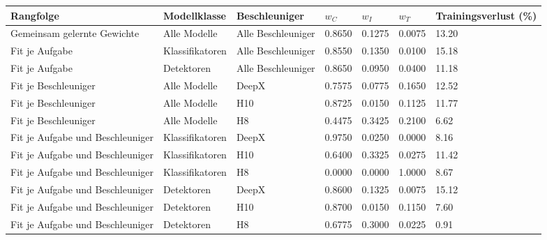 \begin{tabular}{@{}lllllll@{}}
\toprule
Rangfolge & Modellklasse & Beschleuniger & $w_C$ & $w_I$ & $w_T$ & Trainingsverlust (\%) \\
\midrule
Gemeinsam gelernte Gewichte & Alle Modelle & Alle Beschleuniger & 0.8650 & 0.1275 & 0.0075 & 13.20 \\
Fit je Aufgabe & Klassifikatoren & Alle Beschleuniger & 0.8550 & 0.1350 & 0.0100 & 15.18 \\
Fit je Aufgabe & Detektoren & Alle Beschleuniger & 0.8650 & 0.0950 & 0.0400 & 11.18 \\
Fit je Beschleuniger & Alle Modelle & DeepX & 0.7575 & 0.0775 & 0.1650 & 12.52 \\
Fit je Beschleuniger & Alle Modelle & H10 & 0.8725 & 0.0150 & 0.1125 & 11.77 \\
Fit je Beschleuniger & Alle Modelle & H8 & 0.4475 & 0.3425 & 0.2100 & 6.62 \\
Fit je Aufgabe und Beschleuniger & Klassifikatoren & DeepX & 0.9750 & 0.0250 & 0.0000 & 8.16 \\
Fit je Aufgabe und Beschleuniger & Klassifikatoren & H10 & 0.6400 & 0.3325 & 0.0275 & 11.42 \\
Fit je Aufgabe und Beschleuniger & Klassifikatoren & H8 & 0.0000 & 0.0000 & 1.0000 & 8.67 \\
Fit je Aufgabe und Beschleuniger & Detektoren & DeepX & 0.8600 & 0.1325 & 0.0075 & 15.12 \\
Fit je Aufgabe und Beschleuniger & Detektoren & H10 & 0.8700 & 0.0150 & 0.1150 & 7.60 \\
Fit je Aufgabe und Beschleuniger & Detektoren & H8 & 0.6775 & 0.3000 & 0.0225 & 0.91 \\
\bottomrule
\end{tabular}
